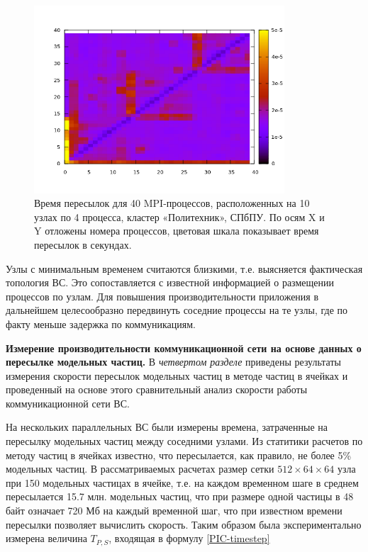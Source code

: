 \begin{figure}[htb]
	\begin{center}
		\includegraphics[height=7cm,keepaspectratio]{images/polytech_all_to_all.png}
	\end{center}
	\caption{Время пересылок для 40 MPI-процессов, расположенных на 10 узлах по 4 процесса, кластер «Политехник», СПбПУ. По осям X и Y отложены номера процессов, цветовая шкала показывает время пересылок в секундах.}
	\label{poly_all2all}
\end{figure} 
Узлы с минимальным временем считаются близкими, т.е. выясняется фактическая топология ВС. Это сопоставляется с известной информацией о размещении процессов по узлам.	Для повышения производительности приложения в дальнейшем целесообразно передвинуть соседние процессы на те узлы, где по факту меньше задержка по коммуникациям.



\textbf{Измерение производительности коммуникационной сети на основе данных о пересылке модельных частиц.}
В \textit{четвертом разделе} приведены результаты измерения скорости пересылок модельных частиц в методе частиц в ячейках и проведенный на основе этого сравнительный анализ скорости работы коммуникационной сети ВС.

На нескольких параллельных ВС были измерены времена, затраченные на пересылку модельных частиц между соседними узлами. Из статитики расчетов по методу частиц в ячейках известно, что пересылается, как правило, не более 5\% модельных частиц. В рассматриваемых расчетах размер сетки $512\times 64 \times 64$ узла  при 150 модельных частицах в ячейке, т.е.  на каждом временном шаге в среднем пересылается 15.7 млн. модельных частиц, что при размере одной частицы в 48 байт означает 720 Мб на каждый временной шаг, что при известном времени пересылки позволяет вычислить скорость. Таким образом была экспериментально измерена величина $T_{P,S}$, входящая в формулу \ref{PIC-timestep}   

